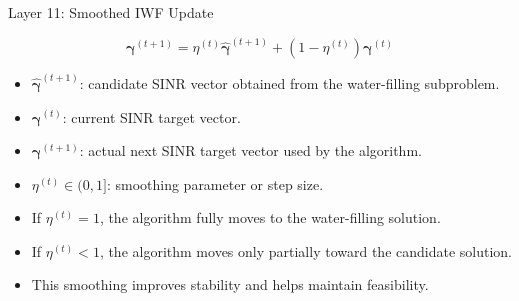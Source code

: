 \documentclass{beamer}
\begin{document}
\begin{frame}{Layer 11: Smoothed IWF Update}
\scriptsize

\[
\boldsymbol{\gamma}^{(t+1)}
=
\eta^{(t)}
\widehat{\boldsymbol{\gamma}}^{(t+1)}
+
\left(1-\eta^{(t)}\right)
\boldsymbol{\gamma}^{(t)}
\]

\begin{itemize}
    \item \(\widehat{\boldsymbol{\gamma}}^{(t+1)}\): candidate SINR vector obtained from the water-filling subproblem.

    \item \(\boldsymbol{\gamma}^{(t)}\): current SINR target vector.

    \item \(\boldsymbol{\gamma}^{(t+1)}\): actual next SINR target vector used by the algorithm.

    \item \(\eta^{(t)}\in(0,1]\): smoothing parameter or step size.

    \item If \(\eta^{(t)}=1\), the algorithm fully moves to the water-filling solution.

    \item If \(\eta^{(t)}<1\), the algorithm moves only partially toward the candidate solution.

    \item This smoothing improves stability and helps maintain feasibility.
\end{itemize}

\end{frame}
\end{document}
